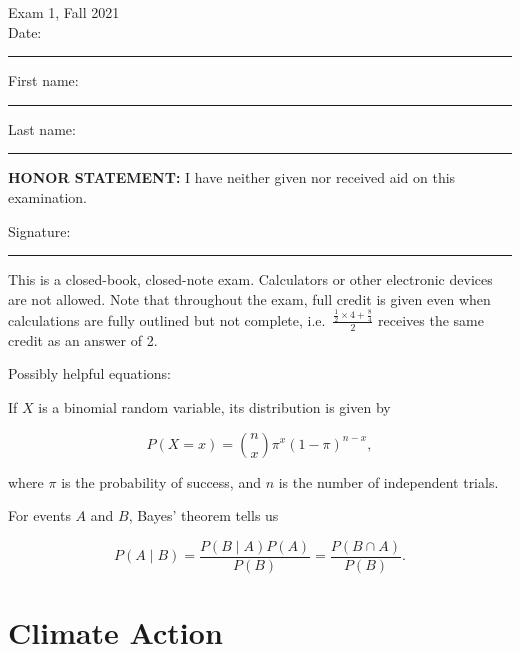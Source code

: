 \documentclass[
  11pt,
  letterpaper,
]{article}
\author{}
\date{}
\begin{document}
\begin{center}
{\LARGE Exam 1, Fall 2021}\\[1.2em]
Date: \rule{1.6in}{0.4pt}
\end{center}

\vspace{2.3em}

First name:

\rule{2.05in}{0.4pt}

\hfill Last name:

\rule{2.05in}{0.4pt}

\vspace{2.2em}

\textbf{HONOR STATEMENT:} I have neither given nor received aid on this
examination.

\vspace{2em}

Signature:

\rule{5.2in}{0.4pt}

\vspace{2.5em}

This is a closed-book, closed-note exam. Calculators or other electronic
devices are not allowed. Note that throughout the exam, full credit is
given even when calculations are fully outlined but not complete,
i.e.~\(\displaystyle \frac{\frac{1}{2}\times 4+\frac{8}{4}}{2}\)
receives the same credit as an answer of 2.

\vspace{2em}

Possibly helpful equations:

If \(X\) is a binomial random variable, its distribution is given by

\[
P(X=x)=\binom{n}{x}\pi^x(1-\pi)^{n-x},
\]

where \(\pi\) is the probability of success, and \(n\) is the number of
independent trials.

\vspace{1.5em}

For events \(A\) and \(B\), Bayes' theorem tells us

\[
P(A\mid B)=\frac{P(B\mid A)P(A)}{P(B)}=\frac{P(B\cap A)}{P(B)}.
\]

\newpage

\section*{Climate Action}\label{climate-action}
\end{document}
